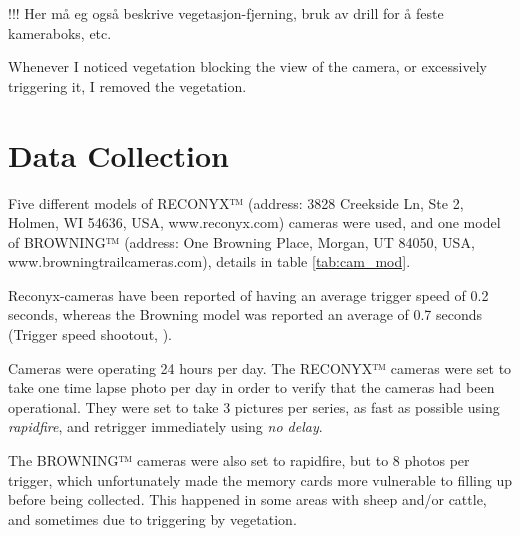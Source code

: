 !!! Her må eg også beskrive vegetasjon-fjerning, bruk av drill for å feste kameraboks, etc.

Whenever I noticed vegetation blocking the view of the camera, or excessively triggering it, I removed the vegetation.



\section{Data Collection} %

Five different models of RECONYX™ (address: 3828 Creekside Ln, Ste 2, Holmen, WI 54636, USA, www.reconyx.com) cameras were used, 
and one model of BROWNING™ (address: One Browning Place, Morgan, UT 84050, USA, www.browningtrailcameras.com), details in table \ref{tab:cam_mod}.

Reconyx-cameras have been reported of having an average trigger speed of 0.2 seconds, whereas the Browning model was reported an average of 0.7 seconds (Trigger speed shootout, \cite{Trailcampro2014}).







Cameras were operating 24 hours per day. The RECONYX™ cameras were set to take one time lapse photo per day in order to verify that the cameras had been operational.
They were set to take 3 pictures per series, as fast as possible using \emph{rapidfire}, and retrigger immediately using \emph{no delay}.

The BROWNING™ cameras were also set to rapidfire, but to 8 photos per trigger, which unfortunately made the memory cards more vulnerable to filling up before being collected. This happened in some areas with sheep and/or cattle, and sometimes due to triggering by vegetation.

